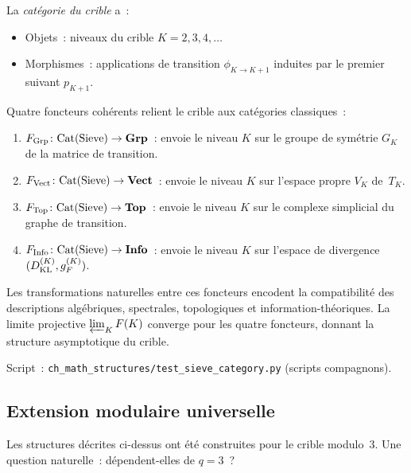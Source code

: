 \documentclass[12pt,a4paper]{article}
\begin{document}
\begin{definition}
\label{def:sieve_category}
La \emph{catégorie du crible} a~:
\begin{itemize}[nosep]
\item Objets~: niveaux du crible $K = 2, 3, 4, \ldots$
\item Morphismes~: applications de transition $\phi_{K \to K+1}$
  induites par le premier suivant $p_{K+1}$.
\end{itemize}
\end{definition}

Quatre foncteurs cohérents relient le crible aux catégories
classiques~:
\begin{enumerate}[nosep]
\item $F_{\rm Grp}\colon \mathrm{Cat}(\mathrm{Sieve}) \to \mathbf{Grp}$~:
  envoie le niveau $K$ sur le groupe de symétrie $G_K$ de la matrice
  de transition.
\item $F_{\rm Vect}\colon \mathrm{Cat}(\mathrm{Sieve}) \to \mathbf{Vect}$~:
  envoie le niveau $K$ sur l'espace propre $V_K$ de~$T_K$.
\item $F_{\rm Top}\colon \mathrm{Cat}(\mathrm{Sieve}) \to \mathbf{Top}$~:
  envoie le niveau $K$ sur le complexe simplicial du graphe de
  transition.
\item $F_{\rm Info}\colon \mathrm{Cat}(\mathrm{Sieve}) \to \mathbf{Info}$~:
  envoie le niveau $K$ sur l'espace de divergence
  $(D_{\rm KL}^{(K)}, g_F^{(K)})$.
\end{enumerate}

Les transformations naturelles entre ces foncteurs encodent la
compatibilité des descriptions algébriques, spectrales, topologiques
et information-théoriques. La limite projective $\varprojlim_K F(K)$
converge pour les quatre foncteurs, donnant la structure asymptotique
du crible.

Script~: \texttt{ch\_math\_structures/test\_sieve\_category.py}
(scripts compagnons).


\subsection{Extension modulaire universelle}
\label{sec:ms_modular}

Les structures décrites ci-dessus ont été construites pour le crible
modulo~3. Une question naturelle~: dépendent-elles de $q = 3$~?
\end{document}
